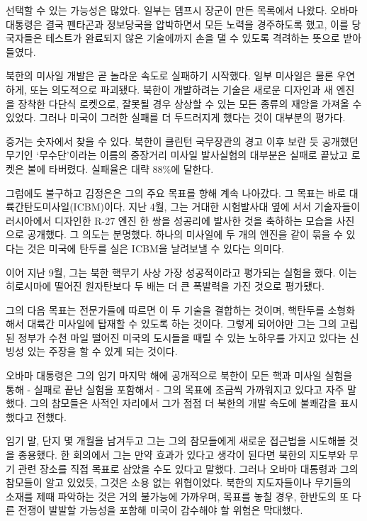 선택할 수 있는 가능성은 많았다. 일부는 뎀프시 장군이 만든 목록에서
나왔다. 오바마 대통령은 결국 펜타곤과 정보당국을 압박하면서 모든 노력을
경주하도록 했고, 이를 당국자들은 테스트가 완료되지 않은 기술에까지 손을
댈 수 있도록 격려하는 뜻으로 받아들였다.

북한의 미사일 개발은 곧 놀라운 속도로 실패하기 시작했다. 일부 미사일은
물론 우연하게, 또는 의도적으로 파괴됐다. 북한이 개발하려는 기술은 새로운
디자인과 새 엔진을 장착한 다단식 로켓으로, 잘못될 경우 상상할 수 있는
모든 종류의 재앙을 가져올 수 있었다. 그러나 미국이 그러한 실패를 더
두드러지게 했다는 것이 대부분의 평가다.

증거는 숫자에서 찾을 수 있다. 북한이 클린턴 국무장관의 경고 이후 보란 듯
공개했던 무기인 `무수단'이라는 이름의 중장거리 미사일 발사실험의
대부분은 실패로 끝났고 로켓은 불에 타버렸다. 실패율은 대략 88\%에
달한다.

그럼에도 불구하고 김정은은 그의 주요 목표를 향해 계속 나아갔다. 그
목표는 바로 대륙간탄도미사일(ICBM)이다. 지난 4월, 그는 거대한 시험발사대
옆에 서서 기술자들이 러시아에서 디자인한 R-27 엔진 한 쌍을 성공리에
발사한 것을 축하하는 모습을 사진으로 공개했다. 그 의도는 분명했다.
하나의 미사일에 두 개의 엔진을 같이 묶을 수 있다는 것은 미국에 탄두를
실은 ICBM을 날려보낼 수 있다는 의미다.

이어 지난 9월, 그는 북한 핵무기 사상 가장 성공적이라고 평가되는 실험을
했다. 이는 히로시마에 떨어진 원자탄보다 두 배는 더 큰 폭발력을 가진
것으로 평가됐다.

그의 다음 목표는 전문가들에 따르면 이 두 기술을 결합하는 것이며,
핵탄두를 소형화해서 대륙간 미사일에 탑재할 수 있도록 하는 것이다. 그렇게
되어야만 그는 그의 고립된 정부가 수천 마일 떨어진 미국의 도시들을 때릴
수 있는 노하우를 가지고 있다는 신빙성 있는 주장을 할 수 있게 되는
것이다.

오바마 대통령은 그의 임기 마지막 해에 공개적으로 북한이 모든 핵과 미사일
실험을 통해 - 실패로 끝난 실험을 포함해서 - 그의 목표에 조금씩
가까워지고 있다고 자주 말했다. 그의 참모들은 사적인 자리에서 그가 점점
더 북한의 개발 속도에 불쾌감을 표시했다고 전했다.

임기 말, 단지 몇 개월을 남겨두고 그는 그의 참모들에게 새로운 접근법을
시도해볼 것을 종용했다. 한 회의에서 그는 만약 효과가 있다고 생각이
된다면 북한의 지도부와 무기 관련 장소를 직접 목표로 삼았을 수도 있다고
말했다. 그러나 오바마 대통령과 그의 참모들이 알고 있었듯, 그것은 소용
없는 위협이었다. 북한의 지도자들이나 무기들의 소재를 제때 파악하는 것은
거의 불가능에 가까우며, 목표를 놓칠 경우, 한반도의 또 다른 전쟁이 발발할
가능성을 포함해 미국이 감수해야 할 위험은 막대했다.

